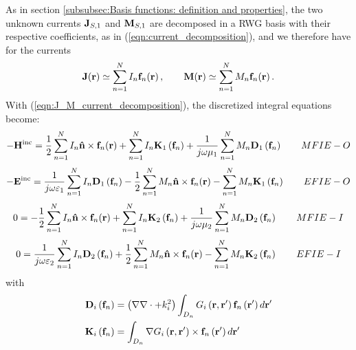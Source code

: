 As in section \ref{subsubsec:Basis functions: definition and properties}, the two unknown currents $\mathbf{J}_{S, 1}$ and $\mathbf{M}_{S, 1}$ are decomposed in a RWG basis with their respective coefficients, as in (\ref{eqn:current_decomposition}), and we therefore have for the currents 
\begin{equation}\label{eqn:J_M_current_decomposition}
\mathbf{J}\!\left(\mathbf{r}\right) \simeq \sum_{n = 1}^{N} I_n \mathbf{f}_n \!\left(\mathbf{r}\right), \qquad \mathbf{M}\!\left(\mathbf{r}\right) \simeq \sum_{n = 1}^{N} M_n \mathbf{f}_n \!\left(\mathbf{r}\right).
\end{equation}
With (\ref{eqn:J_M_current_decomposition}), the discretized integral equations become:
\begin{equation}
-\mathbf{H}^\text{inc} =  \frac{1}{2} \sum_{n=1}^N I_n \mathbf{\hat{n}} \times \mathbf{f}_n\!\left(\mathbf{r}\right) + \sum_{n=1}^{N} I_n \mathbf{K}_1\left(\mathbf{f}_n\right) + \frac{1}{j \omega \mu_1} \sum_{n=1}^{N} M_n \mathbf{D}_1\left(\mathbf{f}_n\right)  \qquad MFIE-O 
\end{equation}
\begin{equation}
-\mathbf{E}^\text{inc} = \frac{1}{j \omega \varepsilon_1} \sum_{n=1}^{N} I_n \mathbf{D}_1\left(\mathbf{f}_n\right) -\frac{1}{2} \sum_{n=1}^N M_n \mathbf{\hat{n}} \times \mathbf{f}_n\!\left(\mathbf{r}\right)  -  \sum_{n=1}^{N} M_n \mathbf{K}_1\left(\mathbf{f}_n\right) \qquad EFIE-O 
\end{equation}
\begin{equation}
0 =  -\frac{1}{2} \sum_{n=1}^N I_n \mathbf{\hat{n}} \times \mathbf{f}_n\!\left(\mathbf{r}\right) + \sum_{n=1}^{N} I_n \mathbf{K}_2\left(\mathbf{f}_n\right) + \frac{1}{j \omega \mu_2} \sum_{n=1}^{N} M_n \mathbf{D}_2\left(\mathbf{f}_n\right)  \qquad MFIE-I 
\end{equation}
\begin{equation}
0 =   \frac{1}{j \omega \varepsilon_2} \sum_{n=1}^{N} I_n \mathbf{D}_2\left(\mathbf{f}_n\right) + \frac{1}{2} \sum_{n=1}^N M_n \mathbf{\hat{n}} \times \mathbf{f}_n\!\left(\mathbf{r}\right) -  \sum_{n=1}^{N} M_n \mathbf{K}_2\left(\mathbf{f}_n\right) \qquad EFIE-I 
\end{equation}
with
\begin{align*}
\mathbf{D}_i\left(\mathbf{f}_n\right) &= \left(\nabla \nabla \cdot + k_i^2\right) \int_{D_n} G_i\left(\mathbf{r}, \mathbf{r}'\right) \mathbf{f}_n\left(\mathbf{r}'\right) d\mathbf{r}' \\
\mathbf{K}_i\left(\mathbf{f}_n\right) &= \int_{D_n} \nabla G_i\left(\mathbf{r}, \mathbf{r}'\right) \times \mathbf{f}_n\left(\mathbf{r}'\right) d\mathbf{r}'
\end{align*}
